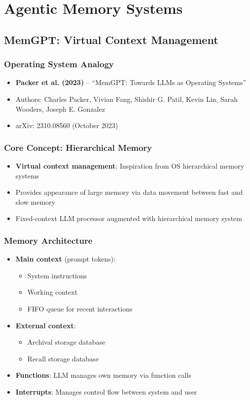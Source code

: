 \documentclass[11pt,letterpaper]{article}
\begin{document}
\section{Agentic Memory Systems}

\subsection{MemGPT: Virtual Context Management}

\subsubsection{Operating System Analogy}
\begin{itemize}[leftmargin=*]
    \item \textbf{Packer et al. (2023)} -- ``MemGPT: Towards LLMs as Operating Systems'' \cite{packer2023memgpt}
    \item Authors: Charles Packer, Vivian Fang, Shishir G. Patil, Kevin Lin, Sarah Wooders, Joseph E. Gonzalez
    \item arXiv: 2310.08560 (October 2023)
\end{itemize}

\subsubsection{Core Concept: Hierarchical Memory}
\begin{itemize}[leftmargin=*]
    \item \textbf{Virtual context management}: Inspiration from OS hierarchical memory systems
    \item Provides appearance of large memory via data movement between fast and slow memory
    \item Fixed-context LLM processor augmented with hierarchical memory system
\end{itemize}

\subsubsection{Memory Architecture}
\begin{itemize}[leftmargin=*]
    \item \textbf{Main context} (prompt tokens):
    \begin{itemize}
        \item System instructions
        \item Working context
        \item FIFO queue for recent interactions
    \end{itemize}
    \item \textbf{External context}:
    \begin{itemize}
        \item Archival storage database
        \item Recall storage database
    \end{itemize}
    \item \textbf{Functions}: LLM manages own memory via function calls
    \item \textbf{Interrupts}: Manages control flow between system and user
\end{itemize}
\end{document}
